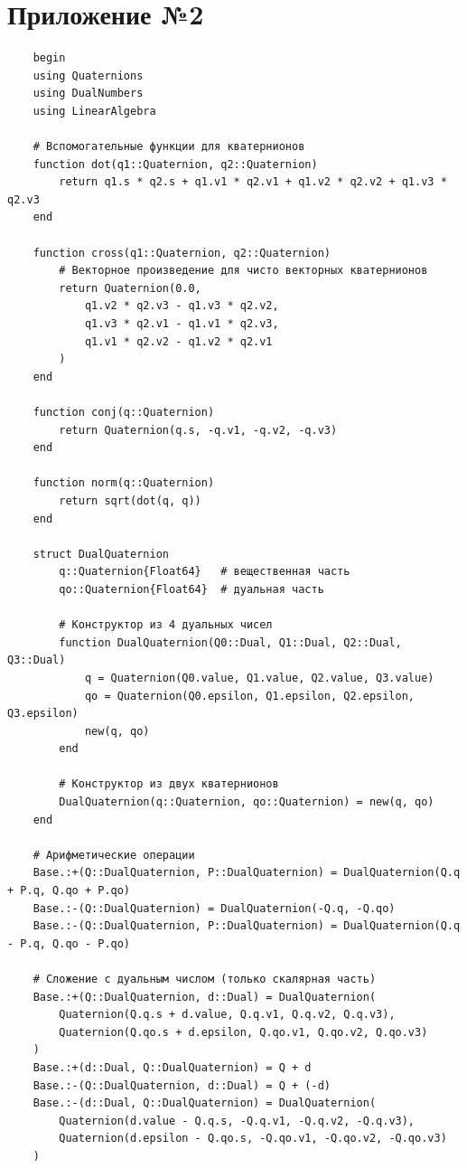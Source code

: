 \section{Приложение №2}

\begin{verbatim}
    begin
    using Quaternions
    using DualNumbers
    using LinearAlgebra
    
    # Вспомогательные функции для кватернионов
    function dot(q1::Quaternion, q2::Quaternion)
        return q1.s * q2.s + q1.v1 * q2.v1 + q1.v2 * q2.v2 + q1.v3 * q2.v3
    end
    
    function cross(q1::Quaternion, q2::Quaternion)
        # Векторное произведение для чисто векторных кватернионов
        return Quaternion(0.0, 
            q1.v2 * q2.v3 - q1.v3 * q2.v2,
            q1.v3 * q2.v1 - q1.v1 * q2.v3,
            q1.v1 * q2.v2 - q1.v2 * q2.v1
        )
    end
    
    function conj(q::Quaternion)
        return Quaternion(q.s, -q.v1, -q.v2, -q.v3)
    end
    
    function norm(q::Quaternion)
        return sqrt(dot(q, q))
    end
    
    struct DualQuaternion
        q::Quaternion{Float64}   # вещественная часть
        qo::Quaternion{Float64}  # дуальная часть
        
        # Конструктор из 4 дуальных чисел
        function DualQuaternion(Q0::Dual, Q1::Dual, Q2::Dual, Q3::Dual)
            q = Quaternion(Q0.value, Q1.value, Q2.value, Q3.value)
            qo = Quaternion(Q0.epsilon, Q1.epsilon, Q2.epsilon, Q3.epsilon)
            new(q, qo)
        end
        
        # Конструктор из двух кватернионов
        DualQuaternion(q::Quaternion, qo::Quaternion) = new(q, qo)
    end
    
    # Арифметические операции
    Base.:+(Q::DualQuaternion, P::DualQuaternion) = DualQuaternion(Q.q + P.q, Q.qo + P.qo)
    Base.:-(Q::DualQuaternion) = DualQuaternion(-Q.q, -Q.qo)
    Base.:-(Q::DualQuaternion, P::DualQuaternion) = DualQuaternion(Q.q - P.q, Q.qo - P.qo)
    
    # Сложение с дуальным числом (только скалярная часть)
    Base.:+(Q::DualQuaternion, d::Dual) = DualQuaternion(
        Quaternion(Q.q.s + d.value, Q.q.v1, Q.q.v2, Q.q.v3),
        Quaternion(Q.qo.s + d.epsilon, Q.qo.v1, Q.qo.v2, Q.qo.v3)
    )
    Base.:+(d::Dual, Q::DualQuaternion) = Q + d
    Base.:-(Q::DualQuaternion, d::Dual) = Q + (-d)
    Base.:-(d::Dual, Q::DualQuaternion) = DualQuaternion(
        Quaternion(d.value - Q.q.s, -Q.q.v1, -Q.q.v2, -Q.q.v3),
        Quaternion(d.epsilon - Q.qo.s, -Q.qo.v1, -Q.qo.v2, -Q.qo.v3)
    )
    

\end{verbatim}
